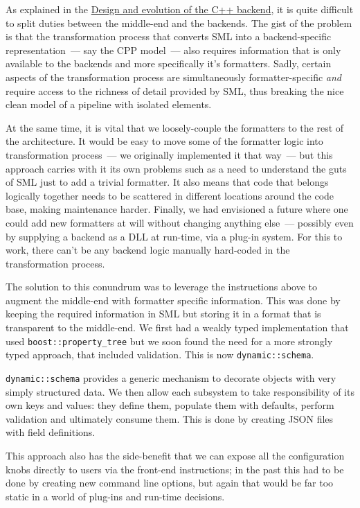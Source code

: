 \documentclass{book}
\begin{document}
As explained in the
\href{https://github.com/DomainDrivenConsulting/dogen/blob/master/doc/manual/manual.org#design-and-evolution-of-the-c-backend}{Design
  and evolution of the C++ backend}, it is quite difficult to split
duties between the middle-end and the backends. The gist of the
problem is that the transformation process that converts SML into a
backend-specific representation~--- say the CPP model~--- also
requires information that is only available to the backends and more
specifically it's formatters. Sadly, certain aspects of the
transformation process are simultaneously formatter-specific
\emph{and} require access to the richness of detail provided by SML,
thus breaking the nice clean model of a pipeline with isolated
elements.

At the same time, it is vital that we loosely-couple the formatters to
the rest of the architecture. It would be easy to move some of the
formatter logic into transformation process~--- we originally
implemented it that way~--- but this approach carries with it its own
problems such as a need to understand the guts of SML just to add a
trivial formatter. It also means that code that belongs logically
together needs to be scattered in different locations around the code
base, making maintenance harder. Finally, we had envisioned a future
where one could add new formatters at will without changing anything
else~--- possibly even by supplying a backend as a DLL at run-time,
via a plug-in system. For this to work, there can't be any backend
logic manually hard-coded in the transformation process.

The solution to this conundrum was to leverage the instructions above
to augment the middle-end with formatter specific information. This
was done by keeping the required information in SML but storing it in
a format that is transparent to the middle-end. We first had a weakly
typed implementation that used \texttt{boost::property\_tree} but we
soon found the need for a more strongly typed approach, that included
validation. This is now \texttt{dynamic::schema}.

\texttt{dynamic::schema} provides a generic mechanism to decorate
objects with very simply structured data. We then allow each subsystem
to take responsibility of its own keys and values: they define them,
populate them with defaults, perform validation and ultimately consume
them. This is done by creating JSON files with field definitions.

This approach also has the side-benefit that we can expose all the
configuration knobs directly to users via the front-end instructions;
in the past this had to be done by creating new command line options,
but again that would be far too static in a world of plug-ins and
run-time decisions.
\end{document}
